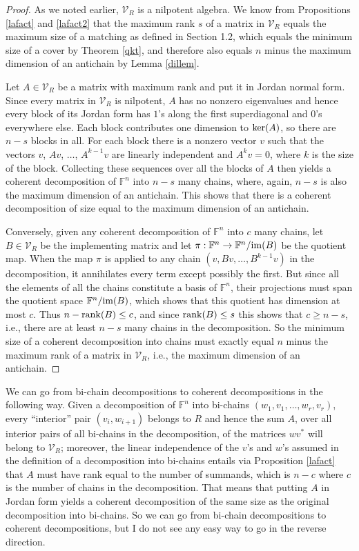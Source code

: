 \documentclass{amsart}
\theoremstyle{definition}
\begin{document}
\begin{proof}
As we noted earlier, $\mathcal{V}_R$ is a nilpotent algebra. We know from Propositions \ref{lafact} and \ref{lafact2} that the maximum rank $s$ of a matrix in $\mathcal{V}_R$ equals the maximum size of a matching as defined in Section 1.2, which equals the minimum size of a cover by Theorem \ref{qkt}, and therefore also equals $n$ minus the maximum dimension of an antichain by Lemma \ref{dillem}. 

Let $A \in \mathcal{V}_R$ be a matrix with maximum rank and put it in Jordan normal form. Since every matrix in $\mathcal{V}_R$ is nilpotent, $A$ has no nonzero eigenvalues and hence every block of its Jordan form has $1$'s along the first superdiagonal and $0$'s everywhere else. Each block contributes one dimension to ${\rm ker}(A)$, so there are $n - s$ blocks in all. For each block there is a nonzero vector $v$ such that the vectors $v$, $Av$, $\ldots$, $A^{k-1}v$ are linearly independent and $A^k v = 0$, where $k$ is the size of the block. Collecting these sequences over all the blocks of $A$ then yields a coherent decomposition of $\mathbb{F}^n$ into $n - s$ many chains, where, again, $n - s$ is also the maximum dimension of an antichain. This shows that there is a coherent decomposition of size equal to the maximum dimension of an antichain.

Conversely, given any coherent decomposition of $\mathbb{F}^n$ into $c$ many chains, let $B \in \mathcal{V}_R$ be the implementing matrix and let $\pi: \mathbb{F}^n \to \mathbb{F}^n/{\rm im}(B)$ be the quotient map. When the map $\pi$ is applied to any chain $(v, Bv, \ldots, B^{k-1}v)$ in the decomposition, it annihilates every term except possibly the first. But since all the elements of all the chains constitute a basis of $\mathbb{F}^n$, their projections must span the quotient space $\mathbb{F}^n/{\rm im}(B)$, which shows that this quotient has dimension at most $c$. Thus $n - {\rm rank}(B) \leq c$, and since ${\rm rank}(B) \leq s$ this shows that $c \geq n - s$, i.e., there are at least $n - s$ many chains in the decomposition. So the minimum size of a coherent decomposition into chains must exactly equal $n$ minus the maximum rank of a matrix in $\mathcal{V}_R$, i.e., the maximum dimension of an antichain.
\end{proof}

We can go from bi-chain decompositions to coherent decompositions in the following way. Given a decomposition of $\mathbb{F}^n$ into bi-chains $(w_1, v_1, \ldots, w_r, v_r)$, every ``interior'' pair $(v_i, w_{i+1})$ belongs to $R$ and hence the sum $A$, over all interior pairs of all bi-chains in the decomposition, of the matrices $wv^*$ will belong to $\mathcal{V}_R$; moreover, the linear independence of the $v$'s and $w$'s assumed in the definition of a decomposition into bi-chains entails via Proposition \ref{lafact} that $A$ must have rank equal to the number of summands, which is $n - c$ where $c$ is the number of chains in the decomposition. That means that putting $A$ in Jordan form yields a coherent decomposition of the same size as the original decomposition into bi-chains. So we can go from bi-chain decompositions to coherent decompositions, but I do not see any easy way to go in the reverse direction.
\end{document}
